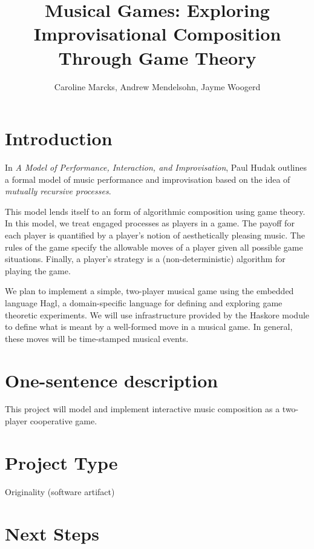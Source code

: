 \documentclass{proc}
\begin{document}
\title{Musical Games: Exploring Improvisational Composition Through Game
Theory}

\author{Caroline Marcks, Andrew Mendelsohn, Jayme Woogerd}

\maketitle

\section{Introduction}

In \emph{A Model of Performance, Interaction, and Improvisation}, Paul Hudak
outlines a formal model of music performance and improvisation based on the idea of  \emph{mutually recursive processes}.  

This model lends itself to an form of algorithmic composition using game theory.  In this model, we treat engaged processes as players in a game.  The payoff for each player is quantified by a player's notion of aesthetically pleasing music.  The rules of the game specify the allowable moves of a player given all possible game situations.  Finally, a player's strategy is a (non-deterministic) algorithm for playing the game.

We plan to implement a simple, two-player musical game using the embedded language Hagl, a domain-specific language for defining and exploring game theoretic experiments.  We will use infrastructure provided by the Haskore module to define what is meant by a well-formed move in a musical game.  In general, these moves will be time-stamped musical events.

\section{One-sentence description}

This project will model and implement interactive music composition as a two-player cooperative game.

\section{Project Type}

Originality (software artifact)

\section{Next Steps}
\end{document}
